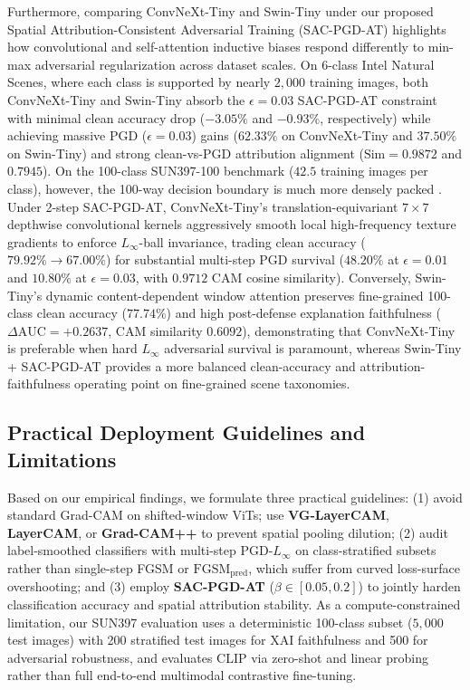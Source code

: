 \documentclass[final,5p,times,twocolumn]{elsarticle}
\begin{document}
Furthermore, comparing ConvNeXt-Tiny and Swin-Tiny under our proposed Spatial Attribution-Consistent Adversarial Training (SAC-PGD-AT) highlights how convolutional and self-attention inductive biases respond differently to min-max adversarial regularization across dataset scales. On 6-class Intel Natural Scenes, where each class is supported by nearly $2,000$ training images, both ConvNeXt-Tiny and Swin-Tiny absorb the $\epsilon=0.03$ SAC-PGD-AT constraint with minimal clean accuracy drop ($-3.05\%$ and $-0.93\%$, respectively) while achieving massive PGD ($\epsilon=0.03$) gains ($62.33\%$ on ConvNeXt-Tiny and $37.50\%$ on Swin-Tiny) and strong clean-vs-PGD attribution alignment ($\text{Sim} = 0.9872$ and $0.7945$). On the 100-class SUN397-100 benchmark ($42.5$ training images per class), however, the 100-way decision boundary is much more densely packed \cite{tsipras2019robustness,zhang2019theoretically}. Under 2-step SAC-PGD-AT, ConvNeXt-Tiny's translation-equivariant $7\times7$ depthwise convolutional kernels aggressively smooth local high-frequency texture gradients to enforce $L_\infty$-ball invariance, trading clean accuracy ($79.92\% \to 67.00\%$) for substantial multi-step PGD survival ($48.20\%$ at $\epsilon=0.01$ and $10.80\%$ at $\epsilon=0.03$, with $0.9712$ CAM cosine similarity). Conversely, Swin-Tiny's dynamic content-dependent window attention preserves fine-grained 100-class clean accuracy ($77.74\%$) and high post-defense explanation faithfulness ($\Delta\text{AUC} = +0.2637$, CAM similarity $0.6092$), demonstrating that ConvNeXt-Tiny is preferable when hard $L_\infty$ adversarial survival is paramount, whereas Swin-Tiny + SAC-PGD-AT provides a more balanced clean-accuracy and attribution-faithfulness operating point on fine-grained scene taxonomies.

\subsection{Practical Deployment Guidelines and Limitations}
Based on our empirical findings, we formulate three practical guidelines: (1) avoid standard Grad-CAM on shifted-window ViTs; use \textbf{VG-LayerCAM}, \textbf{LayerCAM}, or \textbf{Grad-CAM++} to prevent spatial pooling dilution; (2) audit label-smoothed classifiers with multi-step \textbf{$\text{PGD-}L_\infty$} on class-stratified subsets rather than single-step FGSM or $\text{FGSM}_{\text{pred}}$, which suffer from curved loss-surface overshooting; and (3) employ \textbf{SAC-PGD-AT} ($\beta \in [0.05, 0.2]$) to jointly harden classification accuracy and spatial attribution stability. As a compute-constrained limitation, our SUN397 evaluation uses a deterministic 100-class subset ($5,000$ test images) with 200 stratified test images for XAI faithfulness and 500 for adversarial robustness, and evaluates CLIP via zero-shot and linear probing rather than full end-to-end multimodal contrastive fine-tuning.
\end{document}
